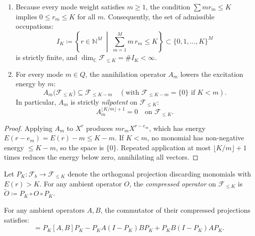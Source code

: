 \begin{proposition}
\label{prop:nilpotency}
\begin{enumerate}
    \item Because every mode weight satisfies $m \ge 1$, the condition $\sum m r_m \le K$ implies $0 \le r_m \le K$ for all $m$. Consequently, the set of admissible occupations:
    \begin{equation}
    I_K \coloneqq \left\{ r \in \mathbb{N}^M \;\middle|\; \sum_{m=1}^M m\, r_m \le K \right\} \subset \{0, 1, \dots, K\}^M
    \end{equation}
    is strictly finite, and $\dim_{\mathbb{C}} \mathcal{F}_{\le K} = \#I_K < \infty$.
    \item For every mode $m \in Q$, the annihilation operator $A_m$ lowers the excitation energy by $m$:
    \begin{equation}
    A_m\big( \mathcal{F}_{\le K} \big) \subseteq \mathcal{F}_{\le K - m} \quad (\text{with } \mathcal{F}_{\le K - m} = \{0\} \text{ if } K < m).
    \end{equation}
    In particular, $A_m$ is strictly \emph{nilpotent} on $\mathcal{F}_{\le K}$:
    \begin{equation}
    A_m^{\lfloor K/m \rfloor + 1} = 0 \quad \text{on } \mathcal{F}_{\le K}.
    \end{equation}
\end{enumerate}
\end{proposition}

\begin{proof}
Applying $A_m$ to $X^r$ produces $m r_m X^{r - e_m}$, which has energy $E(r - e_m) = E(r) - m \le K - m$. If $K < m$, no monomial has non-negative energy $\le K - m$, so the space is $\{0\}$. Repeated application at most $\lfloor K/m \rfloor + 1$ times reduces the energy below zero, annihilating all vectors.
\end{proof}

\begin{definition}
Let $P_K : \mathcal{F}_b \to \mathcal{F}_{\le K}$ denote the orthogonal projection discarding monomials with $E(r) > K$.
For any ambient operator $O$, the \emph{compressed operator} on $\mathcal{F}_{\le K}$ is $\tilde{O} \coloneqq P_K \circ O \circ P_K$.
\end{definition}

\begin{theorem}
\label{thm:compressed_commutator}
For any ambient operators $A, B$, the commutator of their compressed projections satisfies:
\begin{equation}
[P_K A P_K, \; P_K B P_K] = P_K [A, B] P_K - P_K A (I - P_K) B P_K + P_K B (I - P_K) A P_K.
\end{equation}
\end{theorem}

